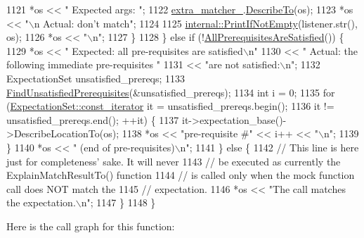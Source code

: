 \begin{DoxyCode}
1121         *os << \textcolor{stringliteral}{"    Expected args: "};
1122         \hyperlink{classtesting_1_1internal_1_1TypedExpectation_a7d2fef3d4429a3a350282e6030a45ba4}{extra\_matcher\_}.\hyperlink{classtesting_1_1internal_1_1MatcherBase_a7e0c883c7745e0d646463077ef1c1267}{DescribeTo}(os);
1123         *os << \textcolor{stringliteral}{"\(\backslash\)n           Actual: don't match"};
1124 
1125         \hyperlink{namespacetesting_1_1internal_afa4cd5d7933878d6d820b32c87bb2767}{internal::PrintIfNotEmpty}(listener.str(), os);
1126         *os << \textcolor{stringliteral}{"\(\backslash\)n"};
1127       \}
1128     \} \textcolor{keywordflow}{else} \textcolor{keywordflow}{if} (!\hyperlink{classtesting_1_1internal_1_1ExpectationBase_a82ba68cdd71a8b5aff5a5be24c23a637}{AllPrerequisitesAreSatisfied}()) \{
1129       *os << \textcolor{stringliteral}{"         Expected: all pre-requisites are satisfied\(\backslash\)n"}
1130           << \textcolor{stringliteral}{"           Actual: the following immediate pre-requisites "}
1131           << \textcolor{stringliteral}{"are not satisfied:\(\backslash\)n"};
1132       ExpectationSet unsatisfied\_prereqs;
1133       \hyperlink{classtesting_1_1internal_1_1ExpectationBase_a9eb518c079f950a59c67e8012d3371c0}{FindUnsatisfiedPrerequisites}(&unsatisfied\_prereqs);
1134       \textcolor{keywordtype}{int} i = 0;
1135       \textcolor{keywordflow}{for} (\hyperlink{classtesting_1_1ExpectationSet_ab269a45f80d8c4f747b29de454a084bb}{ExpectationSet::const\_iterator} it = unsatisfied\_prereqs.begin();
1136            it != unsatisfied\_prereqs.end(); ++it) \{
1137         it->expectation\_base()->DescribeLocationTo(os);
1138         *os << \textcolor{stringliteral}{"pre-requisite #"} << i++ << \textcolor{stringliteral}{"\(\backslash\)n"};
1139       \}
1140       *os << \textcolor{stringliteral}{"                   (end of pre-requisites)\(\backslash\)n"};
1141     \} \textcolor{keywordflow}{else} \{
1142       \textcolor{comment}{// This line is here just for completeness' sake.  It will never}
1143       \textcolor{comment}{// be executed as currently the ExplainMatchResultTo() function}
1144       \textcolor{comment}{// is called only when the mock function call does NOT match the}
1145       \textcolor{comment}{// expectation.}
1146       *os << \textcolor{stringliteral}{"The call matches the expectation.\(\backslash\)n"};
1147     \}
1148   \}
\end{DoxyCode}
Here is the call graph for this function\+:
\nopagebreak
